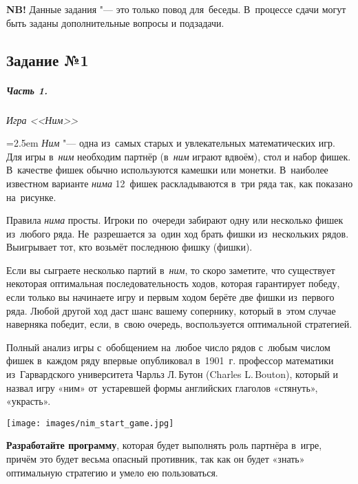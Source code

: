 \documentclass[a4paper,11pt,landscape,notitlepage,oneside,openany,final]{memoir}
\begin{document}
\textbf{NB!} Данные задания "--- это только повод для~беседы. В~процессе сдачи могут быть заданы дополнительные вопросы и подзадачи.



\subsection{Задание №1}
\subparagraph{Часть 1.}
\textit{Игра <<Ним>>}

\bigskip\noindent
\begin{minipage}[T]{0.58\columnwidth}\parindent=2.5em
    \emph{Ним} "--- одна из~самых старых и увлекательных математических игр. Для игры в~\emph{ним} необходим партнёр (в~\emph{ним} играют вдвоём), стол и набор фишек. В~качестве фишек обычно используются камешки или монетки. В~наиболее известном варианте \emph{нима} 12~фишек раскладываются в~три ряда так, как показано на~рисунке.

    Правила \emph{нима} просты. Игроки по~очереди забирают одну или несколько фишек из~любого ряда. Не~разрешается за~один ход брать фишки из~нескольких рядов. Выигрывает тот, кто возьмёт последнюю фишку (фишки).

    \smallskip

    Если вы сыграете несколько партий в~\emph{ним}, то скоро заметите, что существует некоторая оптимальная последовательность ходов, которая гарантирует победу, если только вы начинаете игру и первым ходом берёте две фишки из~первого ряда. Любой другой ход даст шанс вашему сопернику, который в~этом случае наверняка победит, если, в~свою очередь, воспользуется оптимальной стратегией.

    Полный анализ игры с~обобщением на~любое число рядов с~любым числом фишек в~каждом ряду впервые опубликовал в~1901~г. профессор математики из~Гарвардского университета Чарльз Л.\,Бутон (\textenglish{Charles L.\,Bouton}), который и назвал игру «ним» от~устаревшей формы английских глаголов «стянуть», «украсть».
\end{minipage}\hfill\begin{minipage}[T]{0.4\columnwidth}
    \texttt{[image: images/nim\_start\_game.jpg]}
\end{minipage}

\bigskip

\textbf{Разработайте программу}, которая будет выполнять роль партнёра в~игре, причём это будет весьма опасный противник, так как он будет «знать» оптимальную стратегию и умело ею пользоваться.
\end{document}
